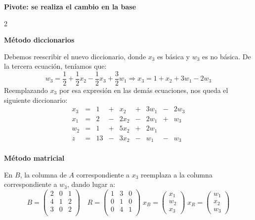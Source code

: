 \documentclass{article}
\begin{document}
    \begin{center}
        \textbf{Pivote: se realiza el cambio en la base}
    \end{center}
    \begin{multicols}{2}
        \raggedcolumns
        \begin{center}
            \textbf{Método diccionarios}
        \end{center}

            Debemos reescribir el nuevo diccionario, donde $x_3$ es básica y $w_3$ es no básica.
De la tercera ecuación, teníamos que:
        \[w_3 = \frac{1}{2}+\frac{1}{2}x_2-\frac{1}{2}x_3+\frac{3}{2}w_1 \Rightarrow x_3=1+x_2+3w_1-2w_3\]
        Reemplazando $x_3$ por esa expresión en las demás ecuaciones, nos queda el siguiente diccionario:
        \[
            \begin{array}{rrrrrrrrr}
                x_3 & = & 1  & + & x_2  & + & 3w_1 & - & 2w_3 \\
                x_1 & = & 2  & - & 2x_2 & - & 2w_1 & + & w_3  \\
                w_2 & = & 1  & + & 5x_2 & + & 2w_1 &   &      \\\hline
                z   & = & 13 & - & 3x_2 & - & w_1  & - & w_3  \\
            \end{array}
        \]
        \columnbreak
        \begin{center}
            \textbf{Método matricial}
        \end{center}

        En $B$, la columna de $A$ correspondiente a $x_3$ reemplaza a la columna correspondiente a $w_3$, dando
        lugar a:
        \[
            B = \begin{pmatrix}
                    2 & 0 & 1 \\
                    4 & 1 & 2 \\
                    3 & 0 & 2 \\
            \end{pmatrix} \quad
            R = \begin{pmatrix}
                    1 & 3 & 0 \\
                    0 & 1 & 0 \\
                    0 & 4 & 1 \\
            \end{pmatrix} \;
            x_B = \begin{pmatrix}
                      x_1 \\
                      w_2 \\
                      x_3
            \end{pmatrix} \;
            x_R = \begin{pmatrix}
                      w_1 \\
                      x_2 \\
                      w_3
            \end{pmatrix}
        \]

    \end{multicols}
\end{document}
